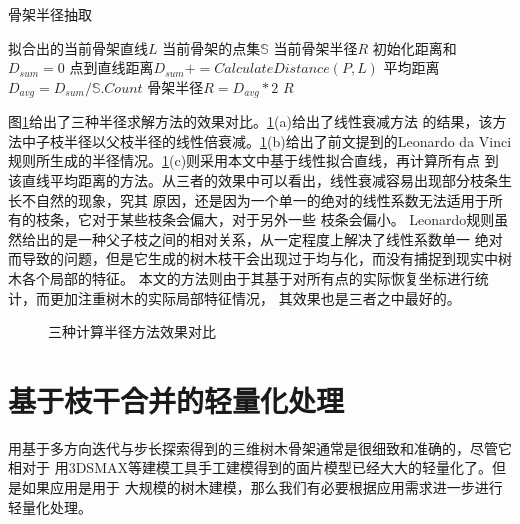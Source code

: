\begin{algorithm}[H]
	\caption{骨架半径抽取}
	\label{alg:radius}
	\begin{algorithmic}[1] 
		\Require 拟合出的当前骨架直线$L$
		\Require 当前骨架的点集$\mathbb{S}$
		\Ensure 当前骨架半径$R$
		\State 初始化距离和$D_{sum}=0$
		\State 点到直线距离$D_{sum}+=CalculateDistance(P, L)$
		\EndFor
		\State 平均距离$D_{avg}=D_{sum}/\mathbb{S}.Count$
		\State 骨架半径$R=D_{avg}*2$
		\State \Return $R$
	\end{algorithmic}
\end{algorithm}

图\ref{fig:radius}给出了三种半径求解方法的效果对比。\ref{fig:radius}(a)给出了线性衰减方法
的结果，该方法中子枝半径以父枝半径的线性倍衰减。\ref{fig:radius}(b)给出了前文提到的Leonardo
 da Vinci规则所生成的半径情况。\ref{fig:radius}(c)则采用本文中基于线性拟合直线，再计算所有点
 到该直线平均距离的方法。从三者的效果中可以看出，线性衰减容易出现部分枝条生长不自然的现象，究其
 原因，还是因为一个单一的绝对的线性系数无法适用于所有的枝条，它对于某些枝条会偏大，对于另外一些
 枝条会偏小。 Leonardo规则虽然给出的是一种父子枝之间的相对关系，从一定程度上解决了线性系数单一
 绝对而导致的问题，但是它生成的树木枝干会出现过于均与化，而没有捕捉到现实中树木各个局部的特征。
 本文的方法则由于其基于对所有点的实际恢复坐标进行统计，而更加注重树木的实际局部特征情况，
 其效果也是三者之中最好的。
 \begin{figure}[H]
	\centering
	\hspace{4em}
	\hspace{4em}
	\hspace{4em}
	\hspace{4em}
	\caption{三种计算半径方法效果对比}
	\label{fig:radius}
\end{figure}

\clearpage
\section{基于枝干合并的轻量化处理}
\label{sec:branchcombine}
用基于多方向迭代与步长探索得到的三维树木骨架通常是很细致和准确的，尽管它相对于
用3DSMAX等建模工具手工建模得到的面片模型已经大大的轻量化了。但是如果应用是用于
大规模的树木建模，那么我们有必要根据应用需求进一步进行轻量化处理。

